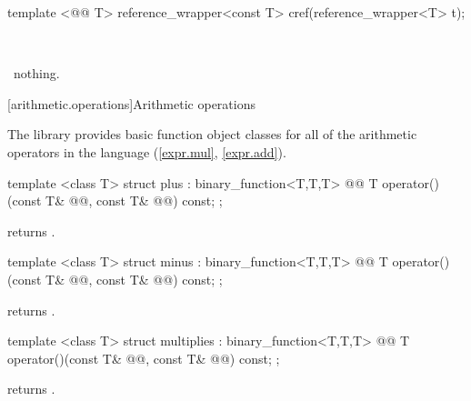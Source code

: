 \documentclass[american,twoside]{book}
\begin{document}
%
%
\begin{itemdecl}
template <@@ T> reference_wrapper<const T> cref(reference_wrapper<T> t);
\end{itemdecl}

\begin{itemdescr}
\pnum\returns\ 

\pnum\throws\  nothing. 
\end{itemdescr}

[arithmetic.operations]{Arithmetic operations}

\pnum
The library provides basic function object classes for all of the arithmetic
operators in the language (\ref{expr.mul}, \ref{expr.add}).

%
\begin{itemdecl}
template <class T> struct plus : binary_function<T,T,T> {
  @@
    T operator()(const T& @@, const T& @@) const;
};
\end{itemdecl}

\begin{itemdescr}
\pnum
{}
returns
.
\end{itemdescr}

%
\begin{itemdecl}
template <class T> struct minus : binary_function<T,T,T> {
  @@
    T operator()(const T& @@, const T& @@) const;
};
\end{itemdecl}

\begin{itemdescr}
\pnum
{}
returns
.
\end{itemdescr}

%
\begin{itemdecl}
template <class T> struct multiplies : binary_function<T,T,T> {
  @@
    T operator()(const T& @@, const T& @@) const;
};
\end{itemdecl}

\begin{itemdescr}
\pnum
{}
returns
.
\end{itemdescr}
\end{document}
